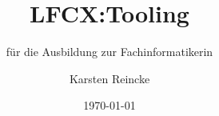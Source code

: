 \documentclass[]{beamer}
\title{LFCX:Tooling}
\subtitle{für die Ausbildung zur Fachinformatikerin}
\institute[GS-LDK]{Gewerbliche Schulen Dillenburg}
\author{Karsten Reincke}
\date{\today}
\def\cfgGl{../../../cfg.gl/}
\begin{document}

\begin{frame}
  \titlepage

  
\end{frame}






\logo{}
\newpage



%
\end{document}
